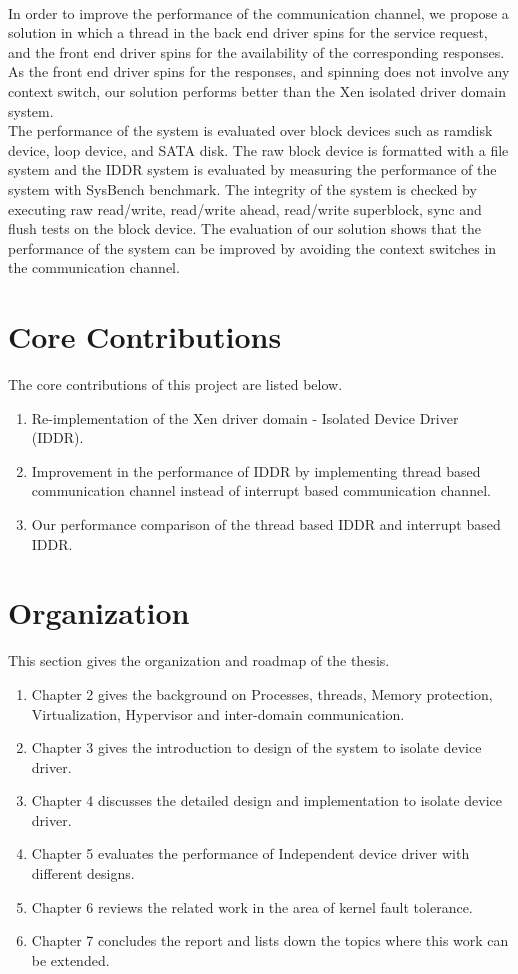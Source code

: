 \\[3mm]
In order to improve the performance of the communication channel, we propose a solution in which a thread in the back end driver spins for the service request, and the front end driver spins for the availability of the corresponding responses. As the front end driver spins for the responses, and spinning does not involve any context switch, our solution performs better than the Xen isolated driver domain system.
\\[3mm]
The performance of the system is evaluated over block devices such as ramdisk device, loop device, and SATA disk. The raw block device is formatted with a file system and the IDDR system is evaluated by measuring the performance of the system with SysBench benchmark. The integrity of the system is checked by executing raw read/write, read/write ahead, read/write superblock, sync and flush tests on the block device. The evaluation of our solution shows that the performance of the system can be improved by avoiding the context switches in the communication channel. 
 \pagebreak

\section{Core Contributions}
The core contributions of this project are listed below. 
\begin{enumerate}
\item Re-implementation of the Xen driver domain - Isolated Device Driver (IDDR).
\item Improvement in the performance of IDDR by implementing thread based communication channel instead of interrupt based communication channel. 
\item Our performance comparison of the thread based IDDR and interrupt based IDDR.
\end{enumerate}

\pagebreak
\section {Organization}
This section gives the organization and roadmap of the thesis.
\begin{enumerate}
\item Chapter 2 gives the background on Processes, threads, Memory protection, Virtualization, Hypervisor and inter-domain communication.
\item Chapter 3 gives the introduction to design of the system to isolate device driver. 
\item Chapter 4 discusses the detailed design and implementation to isolate device driver. 
\item Chapter 5 evaluates the performance of Independent device driver with different designs.
\item Chapter 6 reviews the related work in the area of kernel fault tolerance.
\item Chapter 7 concludes the report and lists down the topics where this work can be extended.
\end{enumerate}

